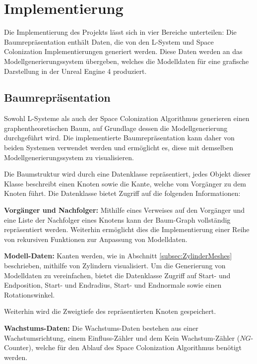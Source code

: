 \chapter{Implementierung}


Die Implementierung des Projekts lässt sich in vier Bereiche unterteilen: Die Baumrepräsentation enthält Daten, die von den L-System und Space Colonization Implementierungen generiert werden. Diese Daten werden an das Modellgenerierungssystem übergeben, welches die Modelldaten für eine grafische Darstellung in der Unreal Engine 4 produziert.


\section{Baumrepräsentation}

Sowohl L-Systeme als auch der Space Colonization Algorithmus generieren einen graphentheoretischen Baum, auf Grundlage dessen die Modellgenerierung durchgeführt wird. Die implementierte Baumrepräsentation kann daher von beiden Systemen verwendet werden und ermöglicht es, diese mit demselben Modellgenerierungssystem zu visualisieren.

Die Baumstruktur wird durch eine Datenklasse repräsentiert, jedes Objekt dieser Klasse beschreibt einen Knoten sowie die Kante, welche vom Vorgänger zu dem Knoten führt. Die Datenklasse bietet Zugriff auf die folgenden Informationen:

\begin{description}
	\item \textbf{Vorgänger und Nachfolger:} Mithilfe eines Verweises auf den Vorgänger und eine Liste der Nachfolger eines Knotens kann der Baum-Graph vollständig repräsentiert werden. Weiterhin ermöglicht dies die Implementierung einer Reihe von rekursiven Funktionen zur Anpassung von Modelldaten.\\
	
	\item \textbf{Modell-Daten:} Kanten werden, wie in Abschnitt \ref{subsec:ZylinderMeshes} beschrieben, mithilfe von Zylindern visualisiert. Um die Generierung von Modelldaten zu vereinfachen, bietet die Datenklasse Zugriff auf Start- und Endposition, Start- und Endradius, Start- und Endnormale sowie einen Rotationswinkel. 
	
	Weiterhin wird die Zweigtiefe des repräsentierten Knoten gespeichert.\\
	
	\item \textbf{Wachstums-Daten:} Die Wachstums-Daten bestehen aus einer Wachstumsrichtung, einem Einfluss-Zähler und dem \glqq Kein Wachstum\grqq-Zähler ($NG$-Counter), welche für den Ablauf des Space Colonization Algorithmus benötigt werden.	
\end{description}

